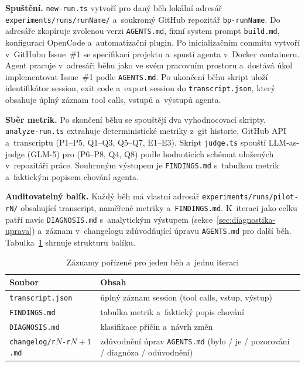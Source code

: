 \textbf{Spuštění.} \texttt{new-run.ts} vytvoří pro daný běh lokální adresář
\texttt{experiments/runs/runName/} a~soukromý GitHub repozitář
\texttt{bp-runName}. Do adresáře zkopíruje zvolenou verzi
\texttt{AGENTS.md}, fixní system prompt \texttt{build.md}, konfiguraci
OpenCode a~automatizační plugin. Po inicializačním commitu vytvoří
v~GitHubu Issue~\#1 se specifikací projektu a~spustí agenta v~Docker
containeru. Agent pracuje v~adresáři běhu jako ve svém pracovním prostoru
a~dostává úkol implementovat Issue~\#1 podle \texttt{AGENTS.md}. Po
ukončení běhu skript uloží identifikátor session, exit code a~export
session do \texttt{transcript.json}, který obsahuje úplný záznam
tool calls, vstupů a~výstupů agenta.

\textbf{Sběr metrik.} Po skončení běhu se spouštějí dva vyhodnocovací
skripty. \texttt{analyze-run.ts} extrahuje deterministické metriky z~git
historie, GitHub API a~transcriptu (\acs{P1}--\acs{P5},
\acs{Q1}--\acs{Q3}, \acs{Q5}--\acs{Q7}, \acs{E1}--\acs{E3}).
Skript \texttt{judge.ts} spouští LLM-as-judge (GLM-5) pro
 (\acs{P6}--\acs{P8}, \acs{Q4}, \acs{Q8})
podle hodnoticích schémat uložených v~repozitáři práce. Souhrnným výstupem
je \texttt{FINDINGS.md} s~tabulkou metrik a~faktickým popisem
chování agenta.

\textbf{Auditovatelný balík.} Každý běh má vlastní adresář
\texttt{experiments/runs/pilot-rN/} obsahující transcript,
naměřené metriky a~\texttt{FINDINGS.md}. K~iteraci jako celku
patří navíc \texttt{DIAGNOSIS.md} s~analytickým výstupem
(sekce~\ref{sec:diagnostika-uprava}) a~záznam v~changelogu
zdůvodňující úpravu \texttt{AGENTS.md} pro další běh.
Tabulka~\ref{tab:zaznamy-bezhu} shrnuje strukturu balíku.

\begin{table}[htbp]
\centering
\caption{Záznamy pořízené pro jeden běh a~jednu iteraci}
\label{tab:zaznamy-bezhu}
\footnotesize
\setlength{\tabcolsep}{4pt}
\begin{tabularx}{\linewidth}{@{}lX@{}}
\toprule
\textbf{Soubor} & \textbf{Obsah} \\
\midrule
\texttt{transcript.json}            & úplný záznam session (tool calls, vstup, výstup) \\
\addlinespace
\texttt{FINDINGS.md}                & tabulka metrik a~faktický popis chování \\
\addlinespace
\texttt{DIAGNOSIS.md}               & klasifikace příčin a~návrh změn \\
\addlinespace
\texttt{changelog/r$N$-r$N{+}1$.md} & zdůvodnění úprav \texttt{AGENTS.md} (bylo / je / pozorování / diagnóza / odůvodnění) \\
\bottomrule
\end{tabularx}
\end{table}
\FloatBarrier


